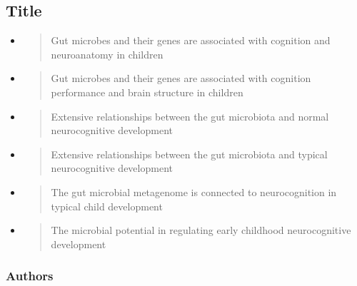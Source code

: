 \documentclass[
]{article}
\author{}
\date{}
\begin{document}
\hypertarget{title}{%
\subsection{Title}\label{title}}

\begin{itemize}
\item
  \begin{quote}
  Gut microbes and their genes are associated with cognition and
  neuroanatomy in children
  \end{quote}
\item
  \begin{quote}
  Gut microbes and their genes are associated with cognition performance
  and brain structure in children
  \end{quote}
\item
  \begin{quote}
  Extensive relationships between the gut microbiota and normal
  neurocognitive development
  \end{quote}
\item
  \begin{quote}
  Extensive relationships between the gut microbiota and typical
  neurocognitive development
  \end{quote}
\item
  \begin{quote}
  The gut microbial metagenome is connected to neurocognition in typical
  child development
  \end{quote}
\item
  \begin{quote}
  The microbial potential in regulating early childhood neurocognitive
  development
  \end{quote}
\end{itemize}

\hypertarget{authors}{%
\subsubsection{Authors}\label{authors}}
\end{document}
